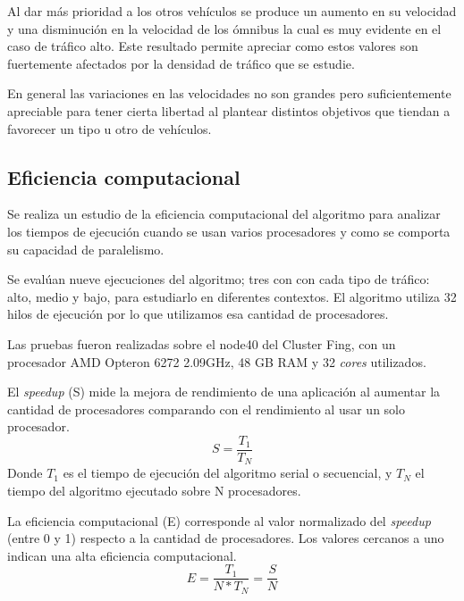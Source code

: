 Al dar más prioridad a los otros vehículos se produce un aumento en su velocidad y una disminución en la velocidad de los ómnibus la cual es muy evidente en el caso de tráfico alto. Este resultado permite apreciar como estos valores son fuertemente afectados por la densidad de tráfico que se estudie.

En general las variaciones en las velocidades no son grandes pero suficientemente apreciable para tener cierta libertad al plantear distintos objetivos que tiendan a favorecer un tipo u otro de vehículos.


\subsection{Eficiencia computacional}

Se realiza un estudio de la eficiencia computacional del algoritmo para analizar los tiempos de ejecución cuando se usan varios procesadores y como se comporta su capacidad de paralelismo.

Se evalúan nueve ejecuciones del algoritmo; tres con con cada tipo de tráfico: alto, medio y bajo, para estudiarlo en diferentes contextos. El algoritmo utiliza 32 hilos de ejecución por lo que utilizamos esa cantidad de procesadores.

Las pruebas fueron realizadas sobre el node40 del Cluster Fing, con un procesador AMD Opteron 6272 2.09GHz, 48 GB RAM y 32 \emph{cores} utilizados.

El \emph{speedup} (S) mide la mejora de rendimiento de una aplicación al aumentar la cantidad de procesadores comparando con el rendimiento al usar un solo procesador.
\begin{equation}
\label{eq:funcion_speedup}
S = \frac{T_1}{T_N}
\end{equation}
Donde ${T_1}$ es el tiempo de ejecución del algoritmo serial o secuencial, y ${T_N}$ el tiempo del algoritmo ejecutado sobre N procesadores.
\newline

La eficiencia computacional (E) corresponde al valor normalizado del \emph{speedup} (entre 0 y 1) respecto a la cantidad de procesadores. Los valores cercanos a uno indican una alta eficiencia computacional.
\begin{equation}
\label{eq:funcion_eficiencia}
E = \frac{T_1}{N*T_N} = \frac{S}{N}
\end{equation}



